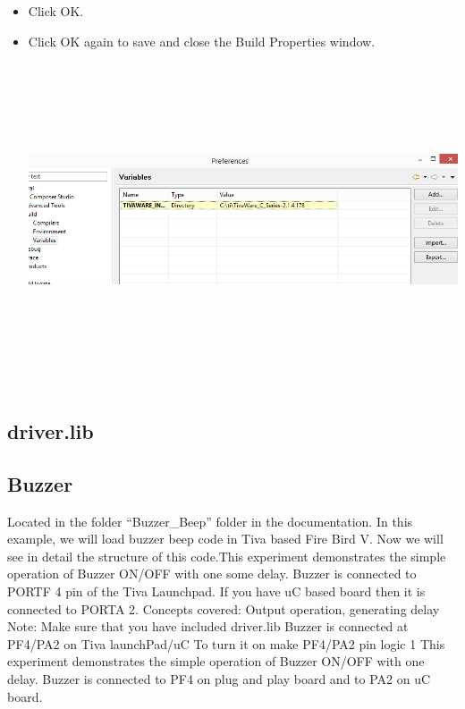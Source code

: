 \documentclass[a4paper,10pt,oneside]{article}
\begin{document}
\begin{itemize}
						\item  Click OK.
						\item  Click OK again to save and close
						the Build Properties window.\\
						\includegraphics[width=20cm,height=10cm]{AddVariables9}
					\end{itemize}
		\subsection{\huge \textbf{driver.lib}}
		\subsection{\huge \textbf{Buzzer}}
		
			Located in the folder “Buzzer\_Beep” folder in the documentation.
			In this example, we will load buzzer beep code in Tiva based Fire Bird V. Now we will see in
			detail the structure of this code.This experiment demonstrates the simple operation of Buzzer ON/OFF with one some delay.
			Buzzer is connected to PORTF 4 pin of the Tiva Launchpad. If you have uC based board then it is connected to PORTA 2.
			Concepts covered: Output operation, generating delay
			Note: Make sure that you have included  driver.lib
			Buzzer is connected at PF4/PA2 on Tiva launchPad/uC
			To turn it on make PF4/PA2 pin logic 1
			This experiment demonstrates the simple operation of Buzzer ON/OFF with
			one delay. Buzzer is connected to PF4 on plug and play board and to PA2 on uC board.
			
\end{document}
